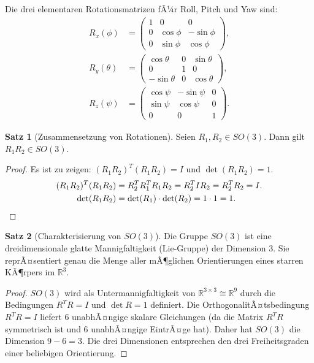 ﻿\documentclass[a4paper,12pt]{article}
\theoremstyle{definition}
\newtheorem{satz}{Satz}
\begin{document}
Die drei elementaren Rotationsmatrizen fÃ¼r Roll, Pitch und Yaw sind:
\begin{align*}
	R_x(\phi) &= \begin{pmatrix} 1 & 0 & 0 \\ 0 & \cos\phi & -\sin\phi \\ 0 & \sin\phi & \cos\phi \end{pmatrix}, \\[4pt]
	R_y(\theta) &= \begin{pmatrix} \cos\theta & 0 & \sin\theta \\ 0 & 1 & 0 \\ -\sin\theta & 0 & \cos\theta \end{pmatrix}, \\[4pt]
	R_z(\psi) &= \begin{pmatrix} \cos\psi & -\sin\psi & 0 \\ \sin\psi & \cos\psi & 0 \\ 0 & 0 & 1 \end{pmatrix}.
\end{align*}

\begin{satz}[Zusammensetzung von Rotationen]
\label{satz:rotation}
	Seien $R_1, R_2 \in SO(3)$. Dann gilt $R_1 R_2 \in SO(3)$.
\end{satz}

\begin{proof}
	Es ist zu zeigen: $(R_1 R_2)^T (R_1 R_2) = I$ und $\det(R_1 R_2) = 1$.
	\begin{align*}
		(R_1 R_2)^T (R_1 R_2) &= R_2^T R_1^T R_1 R_2 = R_2^T I R_2 = R_2^T R_2 = I. \\
		\det(R_1 R_2) &= \det(R_1) \cdot \det(R_2) = 1 \cdot 1 = 1. \qedhere
	\end{align*}
\end{proof}

\begin{satz}[Charakterisierung von $SO(3)$]
\label{satz:so3dim}
	Die Gruppe $SO(3)$ ist eine dreidimensionale glatte Mannigfaltigkeit (Lie-Gruppe) der Dimension 3. Sie reprÃ¤sentiert genau die Menge aller mÃ¶glichen Orientierungen eines starren KÃ¶rpers im $\mathbb{R}^3$.
\end{satz}

\begin{proof}
	$SO(3)$ wird als Untermannigfaltigkeit von $\mathbb{R}^{3\times 3} \cong \mathbb{R}^9$ durch die Bedingungen $R^T R = I$ und $\det R = 1$ definiert. Die OrthogonalitÃ¤tsbedingung $R^TR = I$ liefert $6$ unabhÃ¤ngige skalare Gleichungen (da die Matrix $R^TR$ symmetrisch ist und $6$ unabhÃ¤ngige EintrÃ¤ge hat). Daher hat $SO(3)$ die Dimension $9 - 6 = 3$. Die drei Dimensionen entsprechen den drei Freiheitsgraden einer beliebigen Orientierung. \qedhere
\end{proof}
\end{document}
